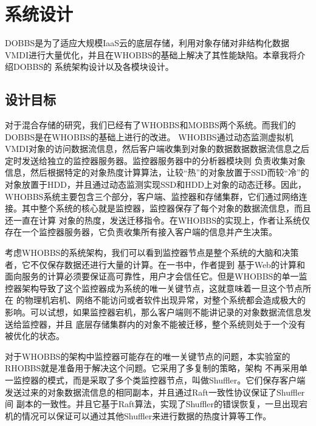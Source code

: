 
\chapter{系统设计}
\label{chap:systemdesign}
DOBBS是为了适应大规模IaaS云的底层存储，利用对象存储对非结构化数据VMDI进行大量优化，并且在WHOBBS的基础上解决了其性能缺陷。本章我将介绍DOBBS的
系统架构设计以及各模块设计。

\section{设计目标}
对于混合存储的研究，我们已经有了WHOBBS\cite{lingxuan2015whobbs}和MOBBS\cite{ma2014mobbs}两个系统。而我们的DOBBS是在WHOBBS的基础上进行的改进。
WHOBBS通过动态监测虚拟机VMDI对象的访问数据流信息，然后客户端收集到对象的数据数据数据流信息之后定时发送给独立的监控器服务器。监控器服务器中的分析器模块则
负责收集对象信息，然后根据特定的对象热度计算算法，让较“热”的对象放置于SSD而较“冷”的对象放置于HDD，并且通过动态监测实现SSD和HDD上对象的动态迁移。因此，
WHOBBS系统主要包含三个部分，客户端、监控器和存储集群，它们通过网络连接。其中整个系统的核心就是监控器，监控器保存了每个对象的数据流信息，而且还一直在计算
对象的热度，发送迁移指令。在WHOBBS的实现上，作者让系统仅存在一个监控器服务器，它负责收集所有接入客户端的信息并产生决策。

考虑WHOBBS的系统架构，我们可以看到监控器节点是整个系统的大脑和决策者，它不仅保存数据还进行大量的计算。在一书中，作者提到
基于Web的计算和面向服务的计算必须要保证高可靠性，用户才会信任它。但是WHOBBS的单一监控器架构导致了这个监控器成为系统的唯一关键节点，这就意味着一旦这个节点所在
的物理机宕机、网络不能访问或者软件出现异常，对整个系统都会造成极大的影响。可以试想，如果监控器宕机，那么客户端则不能讲记录的对象数据流信息发送给监控器，并且
底层存储集群内的对象不能被迁移，整个系统则处于一个没有被优化的状态。

对于WHOBBS的架构中监控器可能存在的唯一关键节点的问题，本实验室的RHOBBS\cite{zhenwang2016rhobbs}就是准备用于解决这个问题。它采用了多复制的策略，架构
不再采用单一监控器的模式，而是采取了多个类监控器节点，叫做Shuffler。它们保存客户端发送过来的对象数据流信息的相同副本，并且通过Raft一致性协议保证了Shuffler间
副本的一致性。并且它基于Raft算法，实现了Shuffler的错误恢复，一旦出现宕机的情况可以保证可以通过其他Shuffler来进行数据的热度计算等工作。

